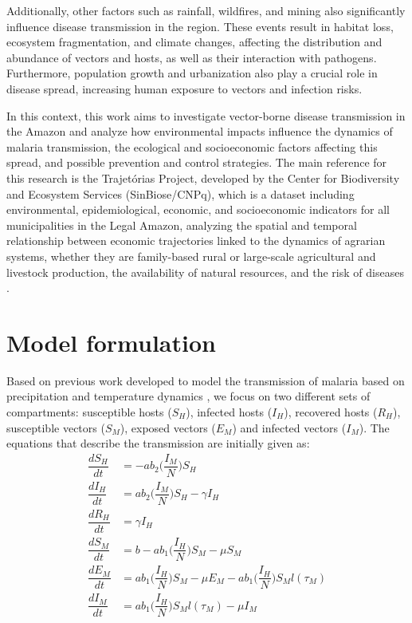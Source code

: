 \documentclass[a4paper,fleqn]{cas-dc}
\begin{document}
Additionally, other factors such as rainfall, wildfires, and mining 
also significantly influence disease transmission in the region. These 
events result in habitat loss, ecosystem fragmentation, and climate 
changes, affecting the distribution and abundance of vectors and hosts, 
as well as their interaction with pathogens. Furthermore, population growth 
and urbanization also play a crucial role in disease spread, increasing 
human exposure to vectors and infection risks.

In this context, this work aims to investigate vector-borne disease 
transmission in the Amazon and analyze how environmental impacts 
influence the dynamics of malaria transmission, the ecological and 
socioeconomic factors affecting this spread, and possible prevention 
and control strategies. The main reference for this research is the 
Trajetórias Project, developed by the Center for Biodiversity and 
Ecosystem Services (SinBiose/CNPq), which is a dataset including 
environmental, epidemiological, economic, and socioeconomic indicators 
for all municipalities in the Legal Amazon, analyzing the spatial and 
temporal relationship between economic trajectories linked to the dynamics 
of agrarian systems, whether they are family-based rural or large-scale 
agricultural and livestock production, the availability of natural resources, 
and the risk of diseases \cite{Rorato2023}.

\section{Model formulation}

Based on previous work developed to model the transmission of malaria based on precipitation and temperature dynamics \cite{Parham2010}, we focus 
on two different sets of compartments: susceptible hosts ($S_H$), infected hosts ($I_H$), recovered hosts ($R_H$), susceptible vectors ($S_M$), 
exposed vectors ($E_M$) and infected vectors ($I_M$). The equations that describe the transmission are initially given as:
\begin{align}
\dfrac{dS_H}{dt} & = -ab_2\bigg(\dfrac{I_M}{N}\bigg)S_H \label{eq1}\\
\dfrac{dI_H}{dt} & = ab_2\bigg(\dfrac{I_M}{N}\bigg)S_H - \gamma I_H \label{eq2}\\
\dfrac{dR_H}{dt} & = \gamma I_H \label{eq3}\\
\dfrac{dS_M}{dt} & = b - ab_1\bigg(\dfrac{I_H}{N}\bigg)S_M - \mu S_M \label{eq4}\\
\dfrac{dE_M}{dt} & = ab_1\bigg(\dfrac{I_H}{N}\bigg)S_M - \mu E_M - ab_1\bigg(\dfrac{I_H}{N}\bigg)S_Ml(\tau_M) \label{eq5}\\
\dfrac{dI_M}{dt} & = ab_1\bigg(\dfrac{I_H}{N}\bigg)S_Ml(\tau_M) - \mu I_M \label{eq6}
\end{align}
\end{document}
